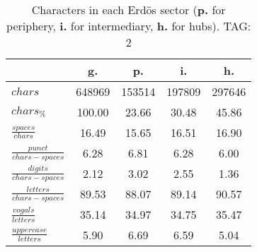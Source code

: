 \begin{table}[h!]
\begin{center}
\begin{tabular}{| l | c | c | c | c |}\hline
 & g. & p. & i. & h. \\\hline
$chars$ & 648969  & 153514  & 197809  & 297646 \\\hline
$chars_{\%}$ & 100.00  & 23.66  & 30.48  & 45.86 \\\hline
$\frac{spaces}{chars}$ & 16.49  & 15.65  & 16.51  & 16.90 \\\hline
$\frac{punct}{chars-spaces}$ & 6.28  & 6.81  & 6.28  & 6.00 \\\hline
$\frac{digits}{chars-spaces}$ & 2.12  & 3.02  & 2.55  & 1.36 \\\hline
$\frac{letters}{chars-spaces}$ & 89.53  & 88.07  & 89.14  & 90.57 \\\hline
$\frac{vogals}{letters}$ & 35.14  & 34.97  & 34.75  & 35.47 \\\hline
$\frac{uppercase}{letters}$ & 5.90  & 6.69  & 6.59  & 5.04 \\\hline
\end{tabular}
\caption{Characters in each Erd\"os sector ({{\bf p.}} for periphery, {{\bf i.}} for intermediary, 
    {{\bf h.}} for hubs). TAG: 2}
\end{center}
\end{table}